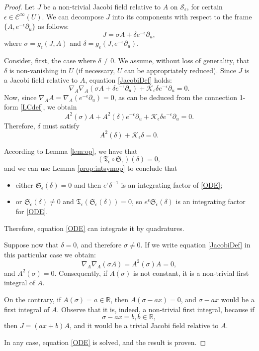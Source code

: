 \documentclass{article}
\theoremstyle{remark}
\theoremstyle{definition}
\begin{document}
\begin{proof}
Let $J$ be a non-trivial Jacobi field relative to $A$ on $\mathcal{S}_{\epsilon}$, for certain $\epsilon\in \mathcal{C}^{\infty}(U)$. We can decompose $J$ into its components with respect to the frame $\{A,e^{-\epsilon}\partial_u\}$ as follows:
$$
J=\sigma A+\delta e^{-\epsilon}\partial_u,
$$
where $\sigma=g_{\epsilon}(J,A)$ and $\delta=g_{\epsilon}(J, e^{-\epsilon}\partial_u)$. 

Consider, first, the case where $\delta\neq 0$. We assume, without loss of generality, that $\delta$ is non-vanishing in $U$ (if necessary, $U$ can be appropriately reduced). Since $J$ is a Jacobi field relative to $A$, equation \eqref{JacobiDef} holds:
\begin{equation}
    \nabla_{A} \nabla_{A}\left( \sigma A+\delta e^{-\epsilon}\partial_u\right)+\mathcal{K}_{\epsilon} \delta e^{-\epsilon}\partial_u=0.
\end{equation}
Now, since $\nabla_{A} A=\nabla_{A}\left(  e^{-\epsilon}\partial_u\right)=0$, as can be deduced from the connection 1-form \eqref{LCdef}, we obtain 
\begin{equation}
    A^2(\sigma) A+A^2(\delta) e^{-\epsilon}\partial_u+ \mathcal{K}_{\epsilon} \delta e^{-\epsilon}\partial_u=0.
\end{equation}
Therefore, $\delta$ must satisfy
\begin{equation}\label{eq:JacDelta}
A^2(\delta)+\mathcal{K}_{\epsilon} \delta=0.
\end{equation}

According to Lemma \ref{lem:op}, we have that
$$
\left(\mathfrak{T}_{\epsilon}\circ \mathfrak{S}_{\epsilon} \right)(\delta)=0,
$$
and we can use Lemma \ref{prop:intsymop} to conclude that
\begin{itemize}
    \item either $\mathfrak{S}_{\epsilon}(\delta)=0$ and then $e^{\epsilon} \delta^{-1}$ is an integrating factor of \eqref{ODE};
    \item or $\mathfrak{S}_{\epsilon}(\delta)\neq 0$ and $\mathfrak{T}_{\epsilon}(\mathfrak{S}_{\epsilon}(\delta))=0$, so $e^{\epsilon} \mathfrak{S}_{\epsilon}(\delta)$ is an integrating factor for \eqref{ODE}.
\end{itemize}
Therefore, equation \eqref{ODE} can integrate it by quadratures.

Suppose now that $\delta=0$, and therefore $\sigma\neq 0$. If we write equation \eqref{JacobiDef} in this particular case we obtain:
\begin{equation}
    \nabla_{A} \nabla_{A}\left( \sigma A\right)=A^2(\sigma)A=0,
\end{equation}
and $A^2(\sigma)=0$. Consequently, if $A(\sigma)$ is not constant, it is a non-trivial first integral of $A$. 

On the contrary, if $A(\sigma)= a\in \mathbb R$, then $A(\sigma-ax)=0$, and $\sigma-ax$ would be a first integral of $A$. Observe that it is, indeed, a non-trivial first integral, because if 
$$
\sigma-ax=b, b\in\mathbb R,
$$
then $J=(ax+b)A$, and it would be a trivial Jacobi field relative to $A$.

In any case, equation \eqref{ODE} is solved, and the result is proven.
\end{proof}
\end{document}
